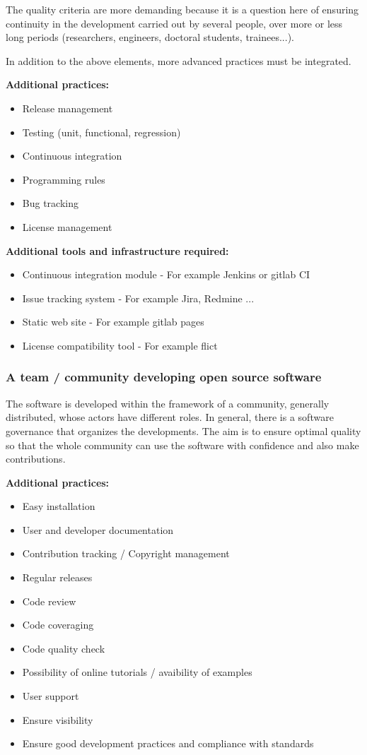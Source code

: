 The quality criteria are more demanding because it is a question here
of ensuring continuity in the development carried out by several
people, over more or less long periods (researchers, engineers,
doctoral students, trainees...).

In addition to the above elements, more advanced practices must be
integrated.

{\bf Additional practices:}
\begin{itemize}
\item Release management
\item Testing (unit, functional, regression)
\item Continuous integration
\item Programming rules
\item Bug tracking
\item License management
\end{itemize}

{\bf Additional tools and infrastructure required:}
\begin{itemize}
\item Continuous integration module - For example Jenkins or gitlab CI
\item Issue tracking system - For example Jira, Redmine ...
\item Static web site - For example gitlab pages 
\item License compatibility tool - For example flict
\end{itemize}


\subsubsection{A team / community developing open source software}

The software is developed within the framework of a community,
generally distributed, whose actors have different roles. In general,
there is a software governance that organizes the developments. The
aim is to ensure optimal quality so that the whole community can use
the software with confidence and also make contributions.

{\bf Additional practices:}
\begin{itemize}
\item Easy installation
\item User and developer documentation
\item Contribution tracking / Copyright management
\item Regular releases
\item Code review
\item Code coveraging
\item Code quality check
\item Possibility of online tutorials / avaibility of examples
\item User support
\item Ensure visibility
\item Ensure good development practices and compliance with standards
\end{itemize}

